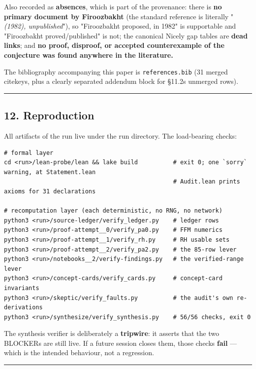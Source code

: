 \documentclass[
  a4paper,
  11pt]{article}
\begin{document}
Also recorded as \textbf{absences}, which is part of the provenance:
there is \textbf{no primary document by Firoozbakht} (the standard
reference is literally "\emph{(1982), unpublished}"), so "Firoozbakht
proposed, in 1982" is supportable and "Firoozbakht proved/published" is
not; the canonical Nicely gap tables are \textbf{dead links}; and
\textbf{no proof, disproof, or accepted counterexample of the conjecture
was found anywhere in the literature.}

The bibliography accompanying this paper is \texttt{references.bib} (31
merged citekeys, plus a clearly separated addendum block for
§11.2\textquotesingle s unmerged rows).

\begin{center}\rule{0.5\linewidth}{0.5pt}\end{center}

\subsection{12. Reproduction}\label{12-reproduction}

All artifacts of the run live under the run directory. The load-bearing
checks:

\begin{verbatim}
# formal layer
cd <run>/lean-probe/lean && lake build          # exit 0; one `sorry` warning, at Statement.lean
                                                # Audit.lean prints axioms for 31 declarations

# recomputation layer (each deterministic, no RNG, no network)
python3 <run>/source-ledger/verify_ledger.py    # ledger rows
python3 <run>/proof-attempt__0/verify_pa0.py    # FFM numerics
python3 <run>/proof-attempt__1/verify_rh.py     # RH usable sets
python3 <run>/proof-attempt__2/verify_pa2.py    # the 85-row lever
python3 <run>/notebooks__2/verify-findings.py   # the verified-range lever
python3 <run>/concept-cards/verify_cards.py     # concept-card invariants
python3 <run>/skeptic/verify_faults.py          # the audit's own re-derivations
python3 <run>/synthesize/verify_synthesis.py    # 56/56 checks, exit 0
\end{verbatim}

The synthesis verifier is deliberately a \textbf{tripwire}: it asserts
that the two BLOCKERs are still live. If a future session closes them,
those checks \textbf{fail} --- which is the intended behaviour, not a
regression.

\begin{center}\rule{0.5\linewidth}{0.5pt}\end{center}
\end{document}
